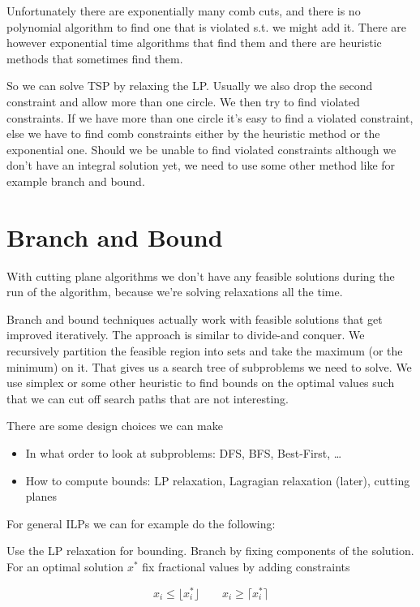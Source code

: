 Unfortunately there are exponentially many comb cuts, and there is no polynomial algorithm to find one that is violated s.t. we might add it. There are however exponential time algorithms that find them and there are heuristic methods that sometimes find them.

So we can solve TSP by relaxing the LP. Usually we also drop the second constraint and allow more than one circle. We then try to find violated constraints. If we have more than one circle it's easy to find a violated constraint, else we have to find comb constraints either by the heuristic method or the exponential one. Should we be unable to find violated constraints although we don't have an integral solution yet, we need to use some other method like for example branch and bound.

\section{Branch and Bound}

With cutting plane algorithms we don't have any feasible solutions during the run of the algorithm, because we're solving relaxations all the time.

Branch and bound techniques actually work with feasible solutions that get improved iteratively. The approach is similar to divide-and conquer. We recursively partition the feasible region into sets and take the maximum (or the minimum) on it. That gives us a search tree of subproblems we need to solve. We use simplex or some other heuristic to find bounds on the optimal values such that we can cut off search paths that are not interesting.

There are some design choices we can make

\begin{itemize}
\item In what order to look at subproblems: DFS, BFS, Best-First, \ldots
\item How to compute bounds: LP relaxation, Lagragian relaxation (later), cutting planes
\end{itemize}

For general ILPs we can for example do the following: 

Use the LP relaxation for bounding. Branch by fixing components of the solution. For an optimal solution $x^*$ fix fractional values by adding constraints

\[x_i\leq  \lfloor x_i^*\rfloor \qquad x_i \geq \lceil x_i^* \rceil\]

